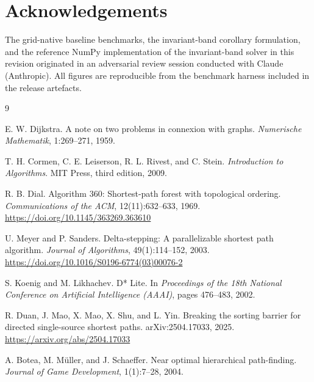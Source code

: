 \documentclass[11pt]{article}
\begin{document}
\section*{Acknowledgements}

The grid-native baseline benchmarks, the invariant-band corollary formulation, and the reference NumPy implementation of the invariant-band solver in this revision originated in an adversarial review session conducted with Claude (Anthropic). All figures are reproducible from the benchmark harness included in the release artefacts.

\begin{thebibliography}{9}

E. W. Dijkstra.
\newblock A note on two problems in connexion with graphs.
\newblock \emph{Numerische Mathematik}, 1:269--271, 1959.

T. H. Cormen, C. E. Leiserson, R. L. Rivest, and C. Stein.
\newblock \emph{Introduction to Algorithms}.
\newblock MIT Press, third edition, 2009.

R. B. Dial.
\newblock Algorithm 360: Shortest-path forest with topological ordering.
\newblock \emph{Communications of the ACM}, 12(11):632--633, 1969.
\newblock \url{https://doi.org/10.1145/363269.363610}

U. Meyer and P. Sanders.
\newblock Delta-stepping: A parallelizable shortest path algorithm.
\newblock \emph{Journal of Algorithms}, 49(1):114--152, 2003.
\newblock \url{https://doi.org/10.1016/S0196-6774(03)00076-2}

S. Koenig and M. Likhachev.
\newblock D* Lite.
\newblock In \emph{Proceedings of the 18th National Conference on Artificial Intelligence (AAAI)}, pages 476--483, 2002.

R. Duan, J. Mao, X. Mao, X. Shu, and L. Yin.
\newblock Breaking the sorting barrier for directed single-source shortest paths.
\newblock arXiv:2504.17033, 2025.
\newblock \url{https://arxiv.org/abs/2504.17033}

A. Botea, M. M\"uller, and J. Schaeffer.
\newblock Near optimal hierarchical path-finding.
\newblock \emph{Journal of Game Development}, 1(1):7--28, 2004.

\end{thebibliography}
\end{document}
